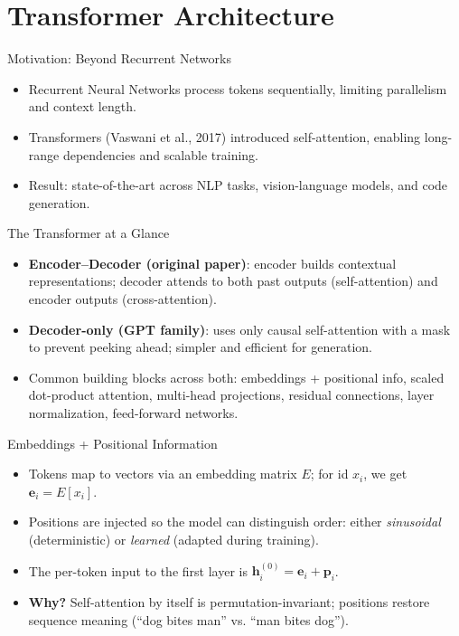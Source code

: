 \documentclass[aspectratio=169]{beamer}
\begin{document}
\section{Transformer Architecture}

\begin{frame}{Motivation: Beyond Recurrent Networks}
  \begin{itemize}
    \item Recurrent Neural Networks process tokens sequentially, limiting parallelism and context length.
    \item Transformers (Vaswani et al., 2017) introduced self-attention, enabling long-range dependencies and scalable training.
    \item Result: state-of-the-art across NLP tasks, vision-language models, and code generation.
  \end{itemize}
\end{frame}

\begin{frame}{The Transformer at a Glance}
  \begin{itemize}
    \item \textbf{Encoder--Decoder (original paper)}: encoder builds contextual representations; decoder attends to both past outputs (self-attention) and encoder outputs (cross-attention).
    \item \textbf{Decoder-only (GPT family)}: uses only causal self-attention with a mask to prevent peeking ahead; simpler and efficient for generation.
    \item Common building blocks across both: embeddings + positional info, scaled dot-product attention, multi-head projections, residual connections, layer normalization, feed-forward networks.
  \end{itemize}
\end{frame}

\begin{frame}{Embeddings + Positional Information}
  \begin{itemize}
    \item Tokens map to vectors via an embedding matrix $E$; for id $x_i$, we get $\mathbf{e}_i = E[x_i]$.
    \item Positions are injected so the model can distinguish order: either \emph{sinusoidal} (deterministic) or \emph{learned} (adapted during training).
    \item The per-token input to the first layer is $\mathbf{h}_i^{(0)} = \mathbf{e}_i + \mathbf{p}_i$.
    \item \textbf{Why?} Self-attention by itself is permutation-invariant; positions restore sequence meaning (``dog bites man'' vs. ``man bites dog'').
  \end{itemize}
\end{frame}
\end{document}
